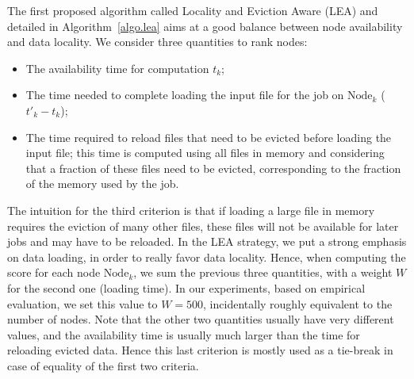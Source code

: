 \documentclass[conference,10pt]{IEEEtran}
\newcommand{\Node}[1]{\ensuremath{\mathrm{Node}_{#1}}\xspace}
\begin{document}

The first proposed algorithm called Locality and Eviction Aware (LEA)
and detailed in Algorithm~\ref{algo.lea} aims at a good balance
between node availability and data locality.  We consider three
quantities to rank nodes:
\begin{itemize}
\item The availability time for computation $t_k$;
\item The time needed to complete loading the input file for the job
  on \Node{k} ($t'_k - t_k$);
\item The time required to reload files that need to be evicted before
  loading the input file; this time is computed using all files in
  memory and considering that a fraction of these files need to be
  evicted, corresponding to the fraction of the memory used by the job.
\end{itemize}

The intuition for the third criterion is that if loading a large file
in memory requires the eviction of many other files, these files will not
be available for later jobs and may have to be reloaded.
In the LEA strategy, we put a strong emphasis on data loading, in order
to really favor data locality. Hence, when computing the score for
each node \Node{k}, we sum the previous three quantities, with a weight
$W$ for the second one (loading time). In our experiments, based on
empirical evaluation, we set this value to $W=500$, incidentally roughly
equivalent to the number of nodes.
Note that the other two quantities usually have very different values,
and the availability time is usually much larger than the time for
reloading evicted data. Hence this last criterion is mostly used as a
tie-break in case of equality of the first two criteria.
\end{document}
